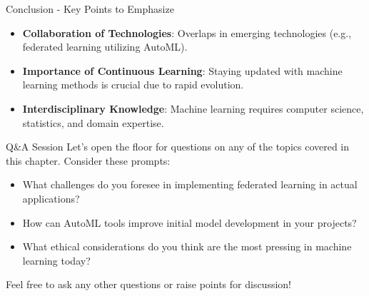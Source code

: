 \documentclass[aspectratio=169]{beamer}
\begin{document}
\begin{frame}[fragile]{Conclusion - Key Points to Emphasize}
    \begin{itemize}
        \item \textbf{Collaboration of Technologies}: Overlaps in emerging technologies (e.g., federated learning utilizing AutoML).
        \item \textbf{Importance of Continuous Learning}: Staying updated with machine learning methods is crucial due to rapid evolution.
        \item \textbf{Interdisciplinary Knowledge}: Machine learning requires computer science, statistics, and domain expertise.
    \end{itemize}
\end{frame}

\begin{frame}[fragile]{Q\&A Session}
    Let’s open the floor for questions on any of the topics covered in this chapter. Consider these prompts:

    \begin{itemize}
        \item What challenges do you foresee in implementing federated learning in actual applications?
        \item How can AutoML tools improve initial model development in your projects?
        \item What ethical considerations do you think are the most pressing in machine learning today?
    \end{itemize}

    Feel free to ask any other questions or raise points for discussion!
\end{frame}
\end{document}
